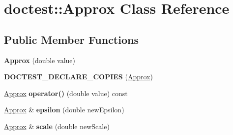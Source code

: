 \hypertarget{classdoctest_1_1_approx}{}\section{doctest\+::Approx Class Reference}
\label{classdoctest_1_1_approx}
\subsection*{Public Member Functions}
\begin{DoxyCompactItemize}
\item 
\mbox{\label{classdoctest_1_1_approx_a86f0d1b44c1cf095697f23ccdab00802}} 
{\bfseries Approx} (double value)
\item 
\mbox{\label{classdoctest_1_1_approx_ad4810f9e396ccee74c3927a30c05709a}} 
{\bfseries D\+O\+C\+T\+E\+S\+T\+\_\+\+D\+E\+C\+L\+A\+R\+E\+\_\+\+C\+O\+P\+I\+ES} (\mbox{\hyperlink{classdoctest_1_1_approx}{Approx}})
\item 
\mbox{\label{classdoctest_1_1_approx_aae907c5ea1c4ac94e134db9e35da7dce}} 
\mbox{\hyperlink{classdoctest_1_1_approx}{Approx}} {\bfseries operator()} (double value) const
\item 
\mbox{\label{classdoctest_1_1_approx_af8df6b0af00fd875e5b6a0c30b86f636}} 
\mbox{\hyperlink{classdoctest_1_1_approx}{Approx}} \& {\bfseries epsilon} (double new\+Epsilon)
\item 
\mbox{\label{classdoctest_1_1_approx_a62185fd4c09a63dab61bd893574d8473}} 
\mbox{\hyperlink{classdoctest_1_1_approx}{Approx}} \& {\bfseries scale} (double new\+Scale)
\end{DoxyCompactItemize}
